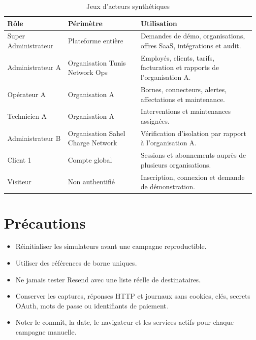 \begin{table}[H]
\centering
\caption{Jeux d'acteurs synthétiques}
\begin{tabularx}{\textwidth}{|L{3.2cm}|L{4.2cm}|Y|}
\hline
{}\textbf{Rôle} & \textbf{Périmètre} & \textbf{Utilisation} \\ \hline
Super Administrateur & Plateforme entière & Demandes de démo, organisations, offres SaaS, intégrations et audit. \\ \hline
Administrateur A & Organisation Tunis Network Ops & Employés, clients, tarifs, facturation et rapports de l'organisation A. \\ \hline
Opérateur A & Organisation A & Bornes, connecteurs, alertes, affectations et maintenance. \\ \hline
Technicien A & Organisation A & Interventions et maintenances assignées. \\ \hline
Administrateur B & Organisation Sahel Charge Network & Vérification d'isolation par rapport à l'organisation A. \\ \hline
Client 1 & Compte global & Sessions et abonnements auprès de plusieurs organisations. \\ \hline
Visiteur & Non authentifié & Inscription, connexion et demande de démonstration. \\ \hline
\end{tabularx}
\end{table}

\section{Précautions}

\begin{itemize}[leftmargin=6mm]
  \item Réinitialiser les simulateurs avant une campagne reproductible.
  \item Utiliser des références de borne uniques.
  \item Ne jamais tester Resend avec une liste réelle de destinataires.
  \item Conserver les captures, réponses HTTP et journaux sans cookies, clés,
        secrets OAuth, mots de passe ou identifiants de paiement.
  \item Noter le commit, la date, le navigateur et les services actifs pour
        chaque campagne manuelle.
\end{itemize}
